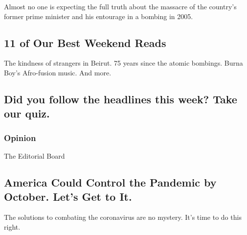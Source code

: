 Almost no one is expecting the full truth about the massacre of the
country's former prime minister and his entourage in a bombing in 2005.

\href{/2020/08/07/briefing/best-weekend-reads.html}{}

\hypertarget{11-of-our-best-weekend-reads}{%
\subsection{11 of Our Best Weekend
Reads}\label{11-of-our-best-weekend-reads}}

The kindness of strangers in Beirut. 75 years since the atomic bombings.
Burna Boy's Afro-fusion music. And more.

\href{/interactive/2020/08/07/briefing/beirut-tiktok-census-bureau-news-quiz.html}{}

\hypertarget{did-you-follow-the-headlines-this-week-take-our-quiz}{%
\subsection{Did you follow the headlines this week? Take our
quiz.}\label{did-you-follow-the-headlines-this-week-take-our-quiz}}

\href{/2020/08/07/briefing/best-weekend-reads.html}{}

\href{https://www.nytimes.com/section/opinion?pagetype=Homepage\&action=click\&module=Opinion}{}

\hypertarget{opinion}{%
\subsubsection{Opinion}\label{opinion}}

\href{/2020/08/08/opinion/sunday/coronavirus-response-testing-lockdown.html}{}

The Editorial Board

\hypertarget{america-could-control-the-pandemic-by-october-lets-get-to-it}{%
\subsection{America Could Control the Pandemic by October. Let's Get to
It.}\label{america-could-control-the-pandemic-by-october-lets-get-to-it}}

The solutions to combating the coronavirus are no mystery. It's time to
do this right.

\href{/2020/08/08/opinion/sunday/coronavirus-response-testing-lockdown.html}{}

